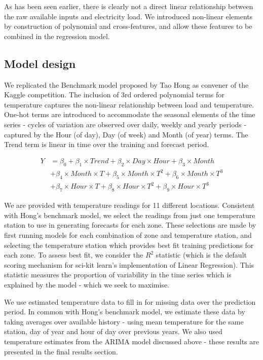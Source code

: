\documentclass{article} %
\begin{document}
As has been seen earlier, there is clearly not a direct linear relationship between the raw available inputs and electricity load.  We  introduced non-linear elements by construction of polynomial and cross-features, and allow these features to be combined in the regression model.

\subsection*{Model design}
We replicated the Benchmark model proposed by Tao Hong as convener of the Kaggle competition.  The inclusion of 3rd ordered polynomial terms for temperature captures the non-linear relationship between load and temperature.  One-hot terms are introduced to accommodate the seasonal elements of the time series - cycles of variation are observed over daily, weekly and yearly periods - captured by the Hour (of day), Day (of week) and Month (of year) terms.  The Trend term is linear in time over the training and forecast period.

\begin{align*}
Y &= \beta_0 + \beta_1 \times Trend + \beta_2 \times Day \times Hour + \beta_3 \times Month \\
&+ \beta_4 \times Month \times T + \beta_5 \times Month \times T^2 + \beta_6 \times Month \times T^3 \\
&+ \beta_7 \times Hour \times T + \beta_8 \times Hour \times T^2 + \beta_9 \times Hour \times T^3 
\end{align*}

We are provided with temperature readings for 11 different locations.  Consistent with Hong's benchmark model, we select the readings from just one temperature station to use in generating forecasts for each zone.  These selections are made by first running models for each combination of zone and temperature station, and selecting the temperature station which provides best fit training predictions for each zone.  To assess best fit, we consider the $R^2$ statistic (which is the default scoring mechanism for sci-kit learn's implementation of Linear Regression).  This statistic measures the proportion of variability in the time series which is explained by the model - which we seek to maximise.

We use estimated temperature data to fill in for missing data over the prediction period.  In common with Hong's benchmark model, we estimate these data by taking averages over available history - using mean temperature for the same station, day of year and hour of day over previous years.  We also used temperature estimates from the ARIMA model discussed above - these results are presented in the final results section.
\end{document}
